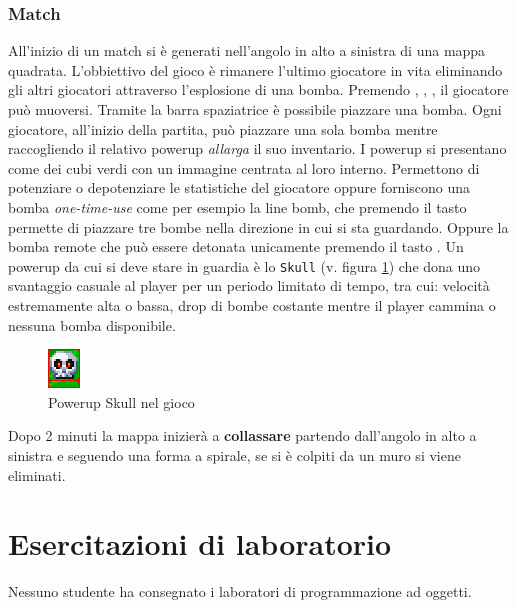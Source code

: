 \documentclass[a4paper,12pt]{report}
\begin{document}
\subsection{Match}
All'inizio di un match si è generati nell'angolo in alto a sinistra di una mappa quadrata. L'obbiettivo del gioco è rimanere l'ultimo giocatore in vita eliminando gli altri giocatori attraverso l'esplosione di una bomba.   
Premendo , , ,  il giocatore può muoversi.
Tramite la barra spaziatrice  è possibile piazzare una bomba.
Ogni giocatore, all'inizio della partita, può piazzare una sola bomba mentre raccogliendo il relativo powerup \textit{allarga} il suo inventario.
\newline
I powerup si presentano come dei cubi verdi con un immagine centrata al loro interno. Permettono di potenziare o depotenziare le statistiche del giocatore oppure forniscono una bomba \textit{one-time-use} come per esempio la line bomb, che premendo il tasto  permette di piazzare tre bombe nella direzione in cui si sta guardando.
Oppure la bomba remote che può essere detonata unicamente premendo il tasto .
\newline
Un powerup da cui si deve stare in guardia è lo \texttt{Skull} (v. figura \ref{img:fig-skull}) che dona uno svantaggio casuale al player per un periodo limitato di tempo, tra cui: velocità estremamente alta o bassa, drop di bombe costante mentre il player cammina o nessuna bomba disponibile. 

\begin{figure}[h]
\centering{}
\includegraphics{img/powerups/skull.png}
\caption{Powerup Skull nel gioco}
\label{img:fig-skull}
\end{figure}
Dopo 2 minuti la mappa inizierà a \textbf{collassare} partendo dall'angolo in alto a sinistra e seguendo una forma a spirale, se si è colpiti da un muro si viene eliminati.

\chapter{Esercitazioni di laboratorio} 
Nessuno studente ha consegnato i laboratori di programmazione ad oggetti. 
\end{document}
